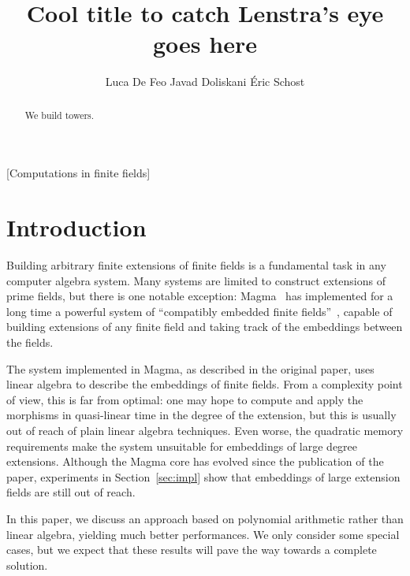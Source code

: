\documentclass{sig-alternate}
\begin{document}
\title{Cool title to catch Lenstra's eye goes here}
\author{
  \alignauthor Luca De Feo
  \alignauthor Javad Doliskani
  \alignauthor \'Eric Schost
}

\maketitle
\begin{abstract}
  We build towers.
\end{abstract}
[Computations in finite fields]


\section{Introduction}
\label{sec:intro}

Building arbitrary finite extensions of finite fields is a fundamental
task in any computer algebra system. Many systems are limited to
construct extensions of prime fields, but there is one notable
exception: Magma~\cite{MAGMA} has implemented for a long time a
powerful system of ``compatibly embedded finite
fields''~\cite{bosma+cannon+steel97}, capable of building extensions
of any finite field and taking track of the embeddings between the
fields.

The system implemented in Magma, as described in the original paper,
uses linear algebra to describe the embeddings of finite fields. From
a complexity point of view, this is far from optimal: one may hope to
compute and apply the morphisms in quasi-linear time in the degree
of the extension, but this is usually out of reach of plain linear
algebra techniques. Even worse, the quadratic memory requirements make
the system unsuitable for embeddings of large degree
extensions. Although the Magma core has evolved since the publication
of the paper, experiments in Section~\ref{sec:impl} show that
embeddings of large extension fields are still out of reach.

In this paper, we discuss an approach based on polynomial arithmetic
rather than linear algebra, yielding much better performances. We only
consider some special cases, but we expect that these results will
pave the way towards a complete solution.
\end{document}

